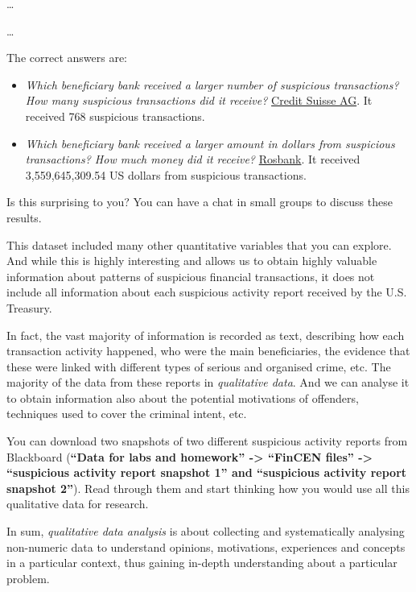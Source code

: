 \documentclass[
]{book}
\begin{document}
\ldots{}

\ldots{}

The correct answers are:

\begin{itemize}
\item
  \emph{Which beneficiary bank received a larger number of suspicious transactions? How many suspicious transactions did it receive?}
  \href{https://en.wikipedia.org/wiki/Credit_Suisse}{Credit Suisse AG}. It received 768 suspicious transactions.
\item
  \emph{Which beneficiary bank received a larger amount in dollars from suspicious transactions? How much money did it receive?}
  \href{https://en.wikipedia.org/wiki/Rosbank}{Rosbank}. It received 3,559,645,309.54 US dollars from suspicious transactions.
\end{itemize}

Is this surprising to you? You can have a chat in small groups to discuss these results.

This dataset included many other quantitative variables that you can explore. And while this is highly interesting and allows us to obtain highly valuable information about patterns of suspicious financial transactions, it does not include all information about each suspicious activity report received by the U.S. Treasury.

In fact, the vast majority of information is recorded as text, describing how each transaction activity happened, who were the main beneficiaries, the evidence that these were linked with different types of serious and organised crime, etc. The majority of the data from these reports in \emph{qualitative data}. And we can analyse it to obtain information also about the potential motivations of offenders, techniques used to cover the criminal intent, etc.

You can download two snapshots of two different suspicious activity reports from Blackboard (\textbf{``Data for labs and homework'' -\textgreater{} ``FinCEN files'' -\textgreater{} ``suspicious activity report snapshot 1'' and ``suspicious activity report snapshot 2''}). Read through them and start thinking how you would use all this qualitative data for research.

In sum, \emph{qualitative data analysis} is about collecting and systematically analysing non-numeric data to understand opinions, motivations, experiences and concepts in a particular context, thus gaining in-depth understanding about a particular problem.
\end{document}
